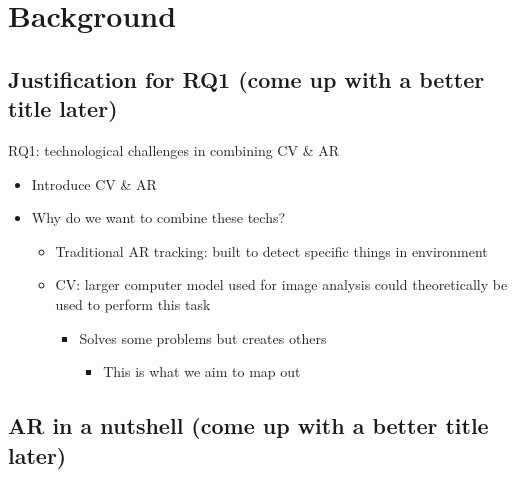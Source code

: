 \chapter{Background} \label{bg}

\section{Justification for RQ1 (come up with a better title later)} \label{rq1-justified}

RQ1: technological challenges in combining CV \& AR
\begin{itemize}
	\item{Introduce CV & AR}
	\item{Why do we want to combine these techs?}
	\begin{itemize}
		\item{Traditional AR tracking: built to detect specific things in environment}
		\item{CV: larger computer model used for image analysis could theoretically be used to perform this task}
		\begin{itemize}
			\item{Solves some problems but creates others}
			\begin{itemize}
				\item{This is what we aim to map out}
			\end{itemize}
		\end{itemize}
	\end{itemize}
\end{itemize}

\section{AR in a nutshell (come up with a better title later)} \label{ar}
